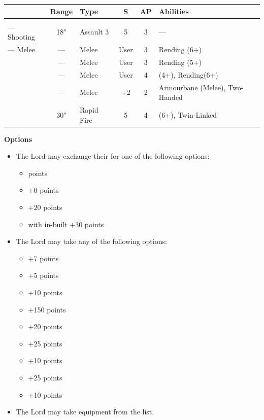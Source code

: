 \begin{minipage}[t]{0.72\textwidth}
	\begin{tabular}{m{90 pt} c C{40pt} *{2}{c} >{\raggedright\arraybackslash}p{130pt}}
		& Range & Type & S & AP & Abilities \\
		\hline
		 & & &  &  &  \\
		— Shooting & 18" & Assault 3 & 5 & 3 & — \\
		— Melee & — & Melee & User & 3 & Rending (6+) \\
		 & — & Melee & User & 3 & Rending (5+) \\
		 & — & Melee & User & 4 &  (4+), Rending(6+) \\
		 & — & Melee & +2 & 2 & Armourbane (Melee), Two-Handed \\
		 & 30" & Rapid Fire & 5 & 4 &  (6+), Twin-Linked \\	
	\end{tabular}
	
	\vspace*{2em}
	\textbf{Options}
	\begin{itemize}
		\item The Lord may exchange their  for one of the following options:
		\begin{itemize}			
			\item {}  points
			\item {} \dotfill +0 points
			\item {} \dotfill +20 points
			\item {} with in-built  \dotfill +30 points
		\end{itemize}
		\item The Lord may take any of the following options:
		\begin{itemize}
			\item {} \dotfill +7 points
			\item {} \dotfill +5 points
			\item {} \dotfill +10 points
			\item {} \dotfill +150 points
			\item {} \dotfill +20 points
			\item {} \dotfill +25 points
			\item {} \dotfill +10 points
			\item {} \dotfill +25 points
			\item {} \dotfill +10 points
		\end{itemize}
		\item The Lord may take equipment from the  list.
	\end{itemize}
\end{minipage}

